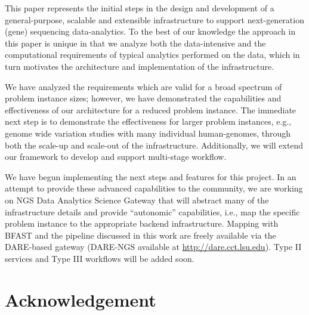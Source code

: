 \documentclass{cpeauth}
\begin{document}
This paper represents the initial steps in the design and development
of a general-purpose, scalable and extensible infrastructure to
support next-generation (gene) sequencing data-analytics. To the best
of our knowledge the approach in this paper is unique in that we
analyze both the data-intensive and the computational requirements of
typical analytics performed on the data, which in turn motivates the
architecture and implementation of the infrastructure. 

We have analyzed the requirements which are valid for a broad spectrum
of problem instance sizes; however, we have demonstrated the
capabilities and effectiveness of our architecture for a reduced
problem instance. The immediate next step is to demonstrate the
effectiveness for larger problem instances, e.g., genome wide
variation studies with many individual human-genomes, through both the
scale-up and scale-out of the infrastructure.  Additionally, we will
extend our framework to develop and support multi-stage workflow.

We have begun implementing the next steps and features for this
project. In an attempt to provide these advanced capabilities to the
community, we are working on NGS Data Analytics Science Gateway that
will abstract many of the infrastructure details and provide
``autonomic'' capabilities, i.e., map the specific problem instance to
the appropriate backend infrastructure.  Mapping with BFAST and the
pipeline discussed in this work are freely available via the
DARE-based gateway (DARE-NGS available at
\url{http://dare.cct.lsu.edu}). Type II services and Type III
workflows will be added soon.


\section*{Acknowledgement}
\end{document}
